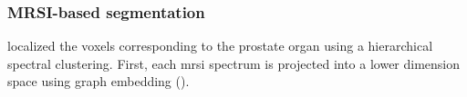 \subsubsection{MRSI-based segmentation}

\cite{Tiwari2009} localized the voxels corresponding to the prostate organ using a hierarchical spectral clustering. First, each \ac{mrsi} spectrum is projected into a lower dimension space using graph embedding (\cite{Shi2000}).


